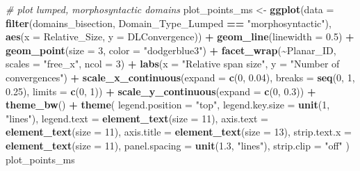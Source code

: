 \documentclass[
]{article}
\newenvironment{Shaded}{\begin{snugshade}}{\end{snugshade}}
\newcommand{\AttributeTok}[1]{\textcolor[rgb]{0.13,0.29,0.53}{#1}}
\newcommand{\CommentTok}[1]{\textcolor[rgb]{0.56,0.35,0.01}{\textit{#1}}}
\newcommand{\DecValTok}[1]{\textcolor[rgb]{0.00,0.00,0.81}{#1}}
\newcommand{\FloatTok}[1]{\textcolor[rgb]{0.00,0.00,0.81}{#1}}
\newcommand{\FunctionTok}[1]{\textcolor[rgb]{0.13,0.29,0.53}{\textbf{#1}}}
\newcommand{\NormalTok}[1]{#1}
\newcommand{\OtherTok}[1]{\textcolor[rgb]{0.56,0.35,0.01}{#1}}
\newcommand{\SpecialCharTok}[1]{\textcolor[rgb]{0.81,0.36,0.00}{\textbf{#1}}}
\newcommand{\StringTok}[1]{\textcolor[rgb]{0.31,0.60,0.02}{#1}}
\begin{document}
\begin{Shaded}
\begin{Highlighting}[]
\CommentTok{\# plot lumped, morphosyntactic domains}
\NormalTok{plot\_points\_ms }\OtherTok{\textless{}{-}} \FunctionTok{ggplot}\NormalTok{(}\AttributeTok{data =} \FunctionTok{filter}\NormalTok{(domains\_bisection, Domain\_Type\_Lumped }\SpecialCharTok{==} \StringTok{"morphosyntactic"}\NormalTok{), }\FunctionTok{aes}\NormalTok{(}\AttributeTok{x =}\NormalTok{ Relative\_Size, }\AttributeTok{y =}\NormalTok{ DLConvergence)) }\SpecialCharTok{+}
  \FunctionTok{geom\_line}\NormalTok{(}\AttributeTok{linewidth =} \FloatTok{0.5}\NormalTok{) }\SpecialCharTok{+}
  \FunctionTok{geom\_point}\NormalTok{(}\AttributeTok{size =} \DecValTok{3}\NormalTok{, }\AttributeTok{color =} \StringTok{"dodgerblue3"}\NormalTok{) }\SpecialCharTok{+}
  \FunctionTok{facet\_wrap}\NormalTok{(}\SpecialCharTok{\textasciitilde{}}\NormalTok{Planar\_ID, }\AttributeTok{scales =} \StringTok{"free\_x"}\NormalTok{, }\AttributeTok{ncol =} \DecValTok{3}\NormalTok{) }\SpecialCharTok{+}
  \FunctionTok{labs}\NormalTok{(}\AttributeTok{x =} \StringTok{"Relative span size"}\NormalTok{, }\AttributeTok{y =} \StringTok{"Number of convergences"}\NormalTok{) }\SpecialCharTok{+}
  \FunctionTok{scale\_x\_continuous}\NormalTok{(}\AttributeTok{expand =} \FunctionTok{c}\NormalTok{(}\DecValTok{0}\NormalTok{, }\FloatTok{0.04}\NormalTok{), }\AttributeTok{breaks =} \FunctionTok{seq}\NormalTok{(}\DecValTok{0}\NormalTok{, }\DecValTok{1}\NormalTok{, }\FloatTok{0.25}\NormalTok{), }\AttributeTok{limits =} \FunctionTok{c}\NormalTok{(}\DecValTok{0}\NormalTok{, }\DecValTok{1}\NormalTok{)) }\SpecialCharTok{+}
  \FunctionTok{scale\_y\_continuous}\NormalTok{(}\AttributeTok{expand =} \FunctionTok{c}\NormalTok{(}\DecValTok{0}\NormalTok{, }\FloatTok{0.3}\NormalTok{)) }\SpecialCharTok{+}
  \FunctionTok{theme\_bw}\NormalTok{() }\SpecialCharTok{+}
  \FunctionTok{theme}\NormalTok{(}
    \AttributeTok{legend.position =} \StringTok{"top"}\NormalTok{,}
    \AttributeTok{legend.key.size =} \FunctionTok{unit}\NormalTok{(}\DecValTok{1}\NormalTok{, }\StringTok{"lines"}\NormalTok{),}
    \AttributeTok{legend.text =} \FunctionTok{element\_text}\NormalTok{(}\AttributeTok{size =} \DecValTok{11}\NormalTok{),}
    \AttributeTok{axis.text =} \FunctionTok{element\_text}\NormalTok{(}\AttributeTok{size =} \DecValTok{11}\NormalTok{),}
    \AttributeTok{axis.title =} \FunctionTok{element\_text}\NormalTok{(}\AttributeTok{size =} \DecValTok{13}\NormalTok{),}
    \AttributeTok{strip.text.x =} \FunctionTok{element\_text}\NormalTok{(}\AttributeTok{size =} \DecValTok{11}\NormalTok{),}
    \AttributeTok{panel.spacing =} \FunctionTok{unit}\NormalTok{(}\FloatTok{1.3}\NormalTok{, }\StringTok{"lines"}\NormalTok{),}
    \AttributeTok{strip.clip =} \StringTok{"off"}
\NormalTok{  )}
\NormalTok{plot\_points\_ms}
\end{Highlighting}
\end{Shaded}
\end{document}
